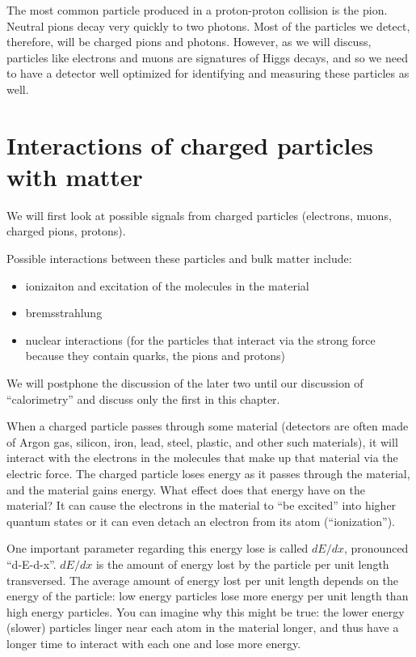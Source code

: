 The most common particle produced in a proton-proton collision is the pion.  Neutral pions decay very quickly to two photons. Most of the particles we detect, therefore, will be charged pions and photons.  However, as we will discuss, particles like electrons and muons are signatures of Higgs decays, and so we need to have a detector well optimized for identifying and measuring these particles as well.




\section{Interactions of charged particles with matter}
We will first look at possible signals from charged particles (electrons, muons, charged pions, protons).

Possible interactions between these particles and bulk matter include:
\begin{itemize}
\item ionizaiton and excitation of the molecules in the material
\item bremsstrahlung
\item nuclear interactions (for the particles that interact via the strong force because they contain quarks, the pions and protons)
\end{itemize}
We will postphone the discussion of the later two until our discussion of ``calorimetry'' and discuss only the first in this chapter.

When a charged particle passes through some material (detectors are often made of Argon gas, silicon, iron, lead, steel, plastic, and other such materials), it will interact with the electrons in the molecules that make up that material via the electric force.  The charged particle loses energy as it passes through the material, and the material gains energy.  What effect does that energy have on the material?  It can cause the electrons in the material to ``be excited'' into higher quantum states or it can even detach an electron from its atom (``ionization'').  

One important parameter regarding this energy lose is called $dE/dx$, pronounced ``d-E-d-x''.  $dE/dx$ is the amount of energy lost by the particle per unit length transversed.  The average amount of energy lost per unit length depends on the energy of the particle: low energy particles lose more energy per unit length than high energy particles.  You can imagine why this might be true: the lower energy (slower) particles linger near each atom in the material longer, and thus have a longer time to interact with each one and lose more energy.

